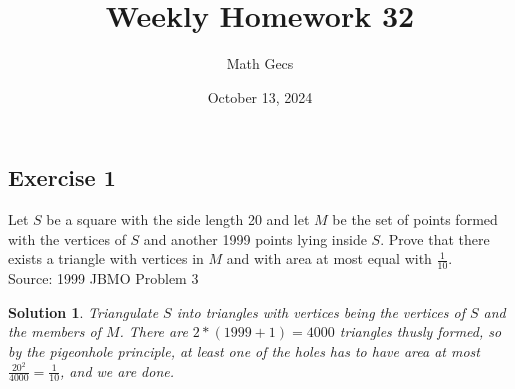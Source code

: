 \documentclass[12pt]{article}
\title{Weekly Homework 32}
\author{Math Gecs}
\date{October 13, 2024}
\newtheorem*{solution*}{Solution}
\begin{document}
\maketitle

\subsection*{Exercise 1}
Let $S$ be a square with the side length 20 and let $M$ be the set of points formed with the vertices of $S$ and another 1999 points lying inside $S$. Prove that there exists a triangle with vertices in $M$ and with area at most equal with $\frac 1{10}$.\\

Source: 1999 JBMO Problem 3\\



\begin{solution*}
Triangulate $S$ into triangles with vertices being the vertices of $S$ and the members of $M$. There are $2*(1999 + 1) = 4000$ triangles thusly formed, so by the pigeonhole principle, at least one of the holes has to have area at most $\frac{20^2}{4000} = \frac{1}{10}$, and we are done.
\end{solution*}
\end{document}
